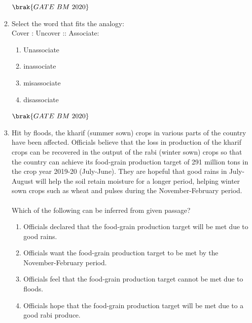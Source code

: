 \documentclass[journal,12pt,onecolumn]{IEEEtran}
\theoremstyle{remark}
\begin{document}
\begin{enumerate}
\begin{enumerate}
    \end{enumerate}
\hfill $\brak{GATE\ BM\ 2020}$

\item Select the word that fits the analogy:
 \\Cover : Uncover :: Associate:\underline {\hspace{2cm}}\\
 \begin{enumerate}
     \item \hspace{0.5cm}Unassociate
     \item \hspace{0.5cm}inassociate
     \item \hspace{0.5cm}misassociate
     \item \hspace{0.5cm}disassociate
      \end{enumerate}
   \hfill $\brak{GATE\ BM\ 2020}$\\ 

 \item Hit by floods, the kharif (summer sown) crops in various parts of the country have been affected. Officials believe that the loss in production of the kharif crops can be recovered in the output of the rabi (winter sown) crops so that the country can achieve its food-grain production target of 291 million tons in the crop year 2019-20 (July-June). They are hopeful that good rains in July-August will help the soil retain moisture for a longer period,
 helping winter sown crops such as wheat and pulses during the November-February period.\\
\\ Which of the following can be inferred from given passage?
 \begin{enumerate}
     \item \hspace{0.5cm}Officials declared that the food-grain production target will be met due to good rains.
     \item \hspace{0.5cm}Officials want the food-grain production target to be met by the November-February period.
     \item \hspace{0.5cm}Officials feel that the food-grain production target cannot be met due to floods.
     \item \hspace{0.5cm}Officials hope that the food-grain production target will be met due to a good rabi produce.\\
     

\end{enumerate}
\end{enumerate}
\end{document}

